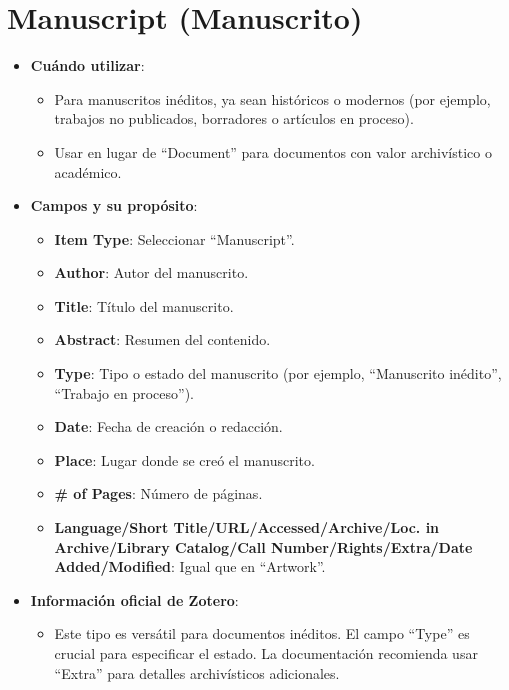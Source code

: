 \documentclass[
  jou,
  floatsintext,
  longtable,
  a4paper,
  nolmodern,
  notxfonts,
  notimes,
  12pt,
  colorlinks=true,linkcolor=blue,citecolor=blue,urlcolor=blue]{apa7}
\providecommand{\tightlist}{%
  \setlength{\itemsep}{0pt}\setlength{\parskip}{0pt}}
\begin{document}
\section{Manuscript (Manuscrito)}\label{manuscript-manuscrito}

\begin{itemize}
\tightlist
\item
  \textbf{Cuándo utilizar}:

  \begin{itemize}
  \tightlist
  \item
    Para manuscritos inéditos, ya sean históricos o modernos (por
    ejemplo, trabajos no publicados, borradores o artículos en proceso).
  \item
    Usar en lugar de ``Document'' para documentos con valor archivístico
    o académico.
  \end{itemize}
\item
  \textbf{Campos y su propósito}:

  \begin{itemize}
  \tightlist
  \item
    \textbf{Item Type}: Seleccionar ``Manuscript''.
  \item
    \textbf{Author}: Autor del manuscrito.
  \item
    \textbf{Title}: Título del manuscrito.
  \item
    \textbf{Abstract}: Resumen del contenido.
  \item
    \textbf{Type}: Tipo o estado del manuscrito (por ejemplo,
    ``Manuscrito inédito'', ``Trabajo en proceso'').
  \item
    \textbf{Date}: Fecha de creación o redacción.
  \item
    \textbf{Place}: Lugar donde se creó el manuscrito.
  \item
    \textbf{\# of Pages}: Número de páginas.
  \item
    \textbf{Language/Short Title/URL/Accessed/Archive/Loc. in
    Archive/Library Catalog/Call Number/Rights/Extra/Date
    Added/Modified}: Igual que en ``Artwork''.
  \end{itemize}
\item
  \textbf{Información oficial de Zotero}:

  \begin{itemize}
  \tightlist
  \item
    Este tipo es versátil para documentos inéditos. El campo ``Type'' es
    crucial para especificar el estado. La documentación recomienda usar
    ``Extra'' para detalles archivísticos adicionales.
  \end{itemize}
\end{itemize}
\end{document}
